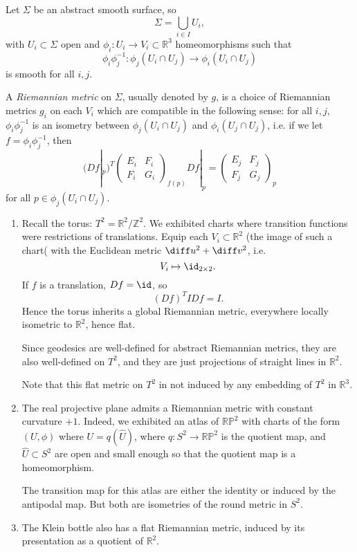\documentclass[12pt]{article}
\begin{document}
\begin{definition}
	Let $\Sigma$ be an abstract smooth surface, so
	\[
	\Sigma = \bigcup_{i \in I} U_i,
	\]
	with $U_i \subset \Sigma$ open and $\phi_i : U_i \to V_i \subset \mathbb{R}^3$ homeomorphisms such that
	\[
	\phi_i \phi_j^{-1} : \phi_j (U_i \cap U_j) \to \phi_i(U_i \cap U_j)
	\]
	is smooth for all $i, j$.

	A \emph{Riemannian metric} on $\Sigma$, usually denoted by $g$, is a choice of Riemannian metrics $g_i$ on each $V_i$ which are compatible in the following sense: for all $i, j$, $\phi_i \phi_j^{-1}$ is an isometry between $\phi_j(U_i \cap U_j)$ and $\phi_i(U_j \cap U_j)$, i.e. if we let $f = \phi_i \phi_j^{-1}$, then
	\[
		(Df|_p)^{T}
		\begin{pmatrix}
			E_i & F_i \\ F_i & G_i
		\end{pmatrix}_{f(p)}
		Df|_p =
		\begin{pmatrix}
			E_j & F_j \\ F_j & G_j
		\end{pmatrix}_{p}
	\]
	for all $p \in \phi_j(U_i \cap U_j)$.
\end{definition}

\begin{exbox}
	\begin{enumerate}
		\item Recall the torus: $T^2 = \mathbb{R}^2/\mathbb{Z}^2$.
			We exhibited charts where transition functions were restrictions of translations. Equip each $V_i \subset \mathbb{R}^2$ (the image of such a chart( with the Euclidean metric $\diff u^2 + \diff v^2$, i.e.
			\[
			V_i \mapsto \id_{2 \times 2}.
			\]
			If $f$ is a translation, $Df = \id$, so
			\[
				(Df)^{T} I Df = I.
			\]
			Hence the torus inherits a global Riemannian metric, everywhere locally isometric to $\mathbb{R}^2$, hence flat.

			Since geodesics are well-defined for abstract Riemannian metrics, they are also well-defined on $T^2$, and they are just projections of straight lines in $\mathbb{R}^2$.

			Note that this flat metric on $T^2$ in not induced by any embedding of $T^2$ in $\mathbb{R}^3$.
		\item The real projective plane admits a Riemannian metric with constant curvature $+1$. Indeed, we exhibited an atlas of $\mathbb{RP}^2$ with charts of the form $(U, \phi)$ where $U = q (\hat U)$, where $q : S^2 \to \mathbb{RP}^2$ is the quotient map, and $\hat U \subset S^2$ are open and small enough so that the quotient map is a homeomorphism.

			The transition map for this atlas are either the identity or induced by the antipodal map. But both are isometries of the round metric in $S^2$.
		\item The Klein bottle also has a flat Riemannian metric, induced by its presentation as a quotient of $\mathbb{R}^2$.
	\end{enumerate}
\end{exbox}
\end{document}
